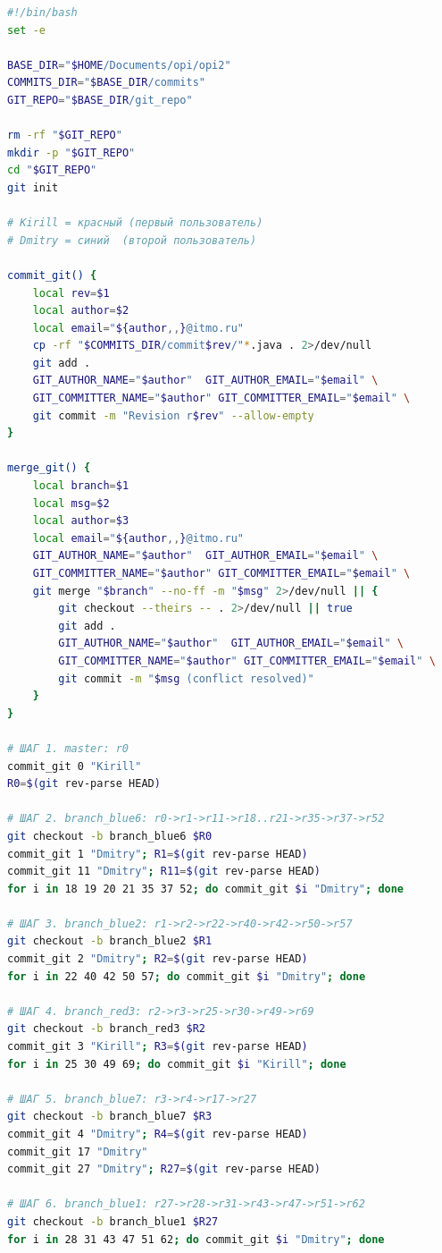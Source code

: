 \documentclass[12pt,a4paper]{article}
\begin{document}
\begin{lstlisting}[language=bash]
#!/bin/bash
set -e

BASE_DIR="$HOME/Documents/opi/opi2"
COMMITS_DIR="$BASE_DIR/commits"
GIT_REPO="$BASE_DIR/git_repo"

rm -rf "$GIT_REPO"
mkdir -p "$GIT_REPO"
cd "$GIT_REPO"
git init

# Kirill = красный (первый пользователь)
# Dmitry = синий  (второй пользователь)

commit_git() {
    local rev=$1
    local author=$2
    local email="${author,,}@itmo.ru"
    cp -rf "$COMMITS_DIR/commit$rev/"*.java . 2>/dev/null
    git add .
    GIT_AUTHOR_NAME="$author"  GIT_AUTHOR_EMAIL="$email" \
    GIT_COMMITTER_NAME="$author" GIT_COMMITTER_EMAIL="$email" \
    git commit -m "Revision r$rev" --allow-empty
}

merge_git() {
    local branch=$1
    local msg=$2
    local author=$3
    local email="${author,,}@itmo.ru"
    GIT_AUTHOR_NAME="$author"  GIT_AUTHOR_EMAIL="$email" \
    GIT_COMMITTER_NAME="$author" GIT_COMMITTER_EMAIL="$email" \
    git merge "$branch" --no-ff -m "$msg" 2>/dev/null || {
        git checkout --theirs -- . 2>/dev/null || true
        git add .
        GIT_AUTHOR_NAME="$author"  GIT_AUTHOR_EMAIL="$email" \
        GIT_COMMITTER_NAME="$author" GIT_COMMITTER_EMAIL="$email" \
        git commit -m "$msg (conflict resolved)"
    }
}

# ШАГ 1. master: r0
commit_git 0 "Kirill"
R0=$(git rev-parse HEAD)

# ШАГ 2. branch_blue6: r0->r1->r11->r18..r21->r35->r37->r52
git checkout -b branch_blue6 $R0
commit_git 1 "Dmitry"; R1=$(git rev-parse HEAD)
commit_git 11 "Dmitry"; R11=$(git rev-parse HEAD)
for i in 18 19 20 21 35 37 52; do commit_git $i "Dmitry"; done

# ШАГ 3. branch_blue2: r1->r2->r22->r40->r42->r50->r57
git checkout -b branch_blue2 $R1
commit_git 2 "Dmitry"; R2=$(git rev-parse HEAD)
for i in 22 40 42 50 57; do commit_git $i "Dmitry"; done

# ШАГ 4. branch_red3: r2->r3->r25->r30->r49->r69
git checkout -b branch_red3 $R2
commit_git 3 "Kirill"; R3=$(git rev-parse HEAD)
for i in 25 30 49 69; do commit_git $i "Kirill"; done

# ШАГ 5. branch_blue7: r3->r4->r17->r27
git checkout -b branch_blue7 $R3
commit_git 4 "Dmitry"; R4=$(git rev-parse HEAD)
commit_git 17 "Dmitry"
commit_git 27 "Dmitry"; R27=$(git rev-parse HEAD)

# ШАГ 6. branch_blue1: r27->r28->r31->r43->r47->r51->r62
git checkout -b branch_blue1 $R27
for i in 28 31 43 47 51 62; do commit_git $i "Dmitry"; done


\end{lstlisting}
\end{document}
